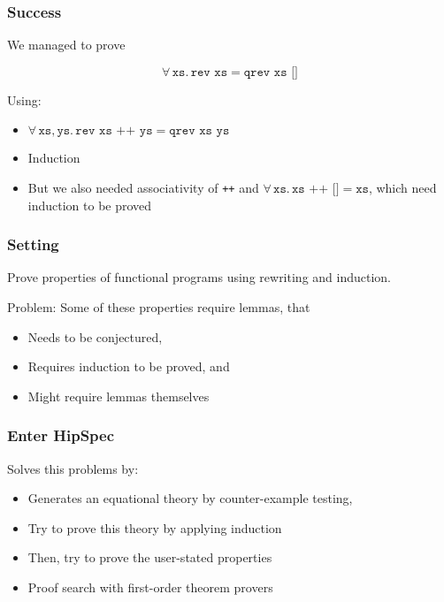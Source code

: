 \documentclass[serif,professionalfont]{beamer}
\newcommand\fa[1]{ \forall \, #1 . \,}
\newcommand\faa[2]{ \forall \, #1 , #2 . \,}
\newcommand\dn[0]{\vspace{\baselineskip}}
\newcommand\hs[1]{\texttt{#1}}
\newcommand\xs[0]{\hs{xs}}
\newcommand\ys[0]{\hs{ys}}
\begin{document}
\begin{frame}[fragile]
  \frametitle{Success}

     We managed to prove

     \begin{equation*}
     \fa{\xs} \hs{rev xs} = \hs{qrev xs []}
     \end{equation*}

     Using:

     \begin{itemize}
       \item $\faa{\xs}{\ys} \hs{rev xs ++ ys} = \hs{qrev xs ys}$
       \item Induction
         \pause
       \item But we also needed associativity of \hs{++} and $\fa{\xs} \hs{xs ++ []} = \xs$,
             which need induction to be proved
     \end{itemize}
\end{frame}

\begin{frame}
  \frametitle{Setting}

  Prove properties of functional programs using rewriting and
  induction.

  \dn

  {\color{Purpleee} Problem:} Some of these properties require lemmas, that

  \begin{itemize}
    \item Needs to be conjectured,
    \item Requires induction to be proved, and
    \item Might require lemmas themselves
  \end{itemize}

\end{frame}

\begin{frame}
  \frametitle{Enter HipSpec}

  Solves this problems by:

  \begin{itemize}
    \item Generates an equational theory by counter-example testing,
    \item Try to prove this theory by applying induction
    \item Then, try to prove the user-stated properties
    \item Proof search with first-order theorem provers
  \end{itemize}
\end{frame}
\end{document}
